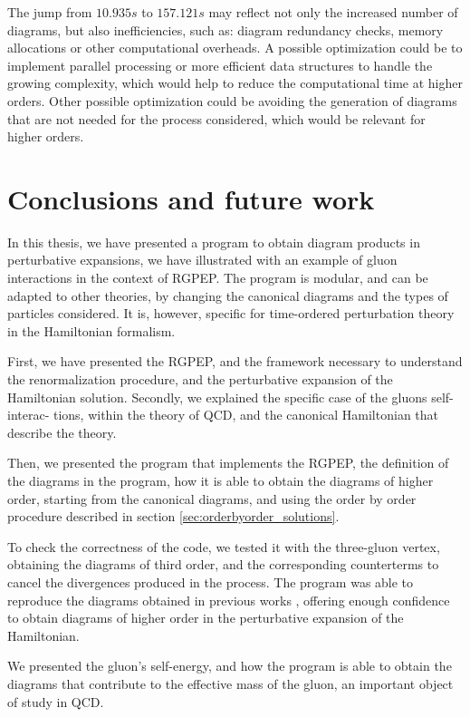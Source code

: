 \documentclass[11pt,a4paper,twoside,pdf]{article}
\numberwithin{equation}{section}
\begin{document}
The jump from $10.935 s$ to $157.121 s$ may reflect not only the increased number of diagrams, 
but also inefficiencies, such as: diagram redundancy checks, memory allocations or 
other computational overheads. A possible optimization could be to implement 
parallel processing or more efficient data structures to handle the growing complexity, 
which would help to reduce the computational time at higher orders. Other possible
optimization could be avoiding the generation of diagrams that are not needed for the 
process considered, which would be relevant for higher orders.

\newpage

\section{Conclusions and future work} \label{sec:conclusions}

In this thesis, we have presented a program to obtain diagram products in
perturbative expansions, we have illustrated with an example of gluon interactions in 
the context of RGPEP.
The program is modular, and can be adapted to other theories, by changing the
canonical diagrams and the types of particles considered. It is, however, specific for
time-ordered perturbation theory in the Hamiltonian formalism.

First, we have presented the RGPEP, and the framework necessary to understand the 
renormalization procedure, and the perturbative expansion of the Hamiltonian solution. 
Secondly, we explained the specific case of the gluons self-interac- tions, within the
theory of QCD, and the canonical Hamiltonian that describe the theory.

Then, we presented the program that implements the RGPEP, the definition of the diagrams 
in the program, how it is able to obtain the diagrams of higher order, starting
from the canonical diagrams, and using the order by order procedure described in section
\ref{sec:orderbyorder_solutions}. 

To check the correctness of the code, we tested it with the three-gluon vertex,
obtaining the diagrams of third order, and the corresponding counterterms to cancel
the divergences produced in the process. The program was able to reproduce the
diagrams obtained in previous works \cite{QCDG}, offering enough confidence to obtain diagrams of
higher order in the perturbative expansion of the Hamiltonian.

We presented the gluon's self-energy, and how the program is able to
obtain the diagrams that contribute to the effective mass
of the gluon, an important object of study in QCD.
\end{document}
